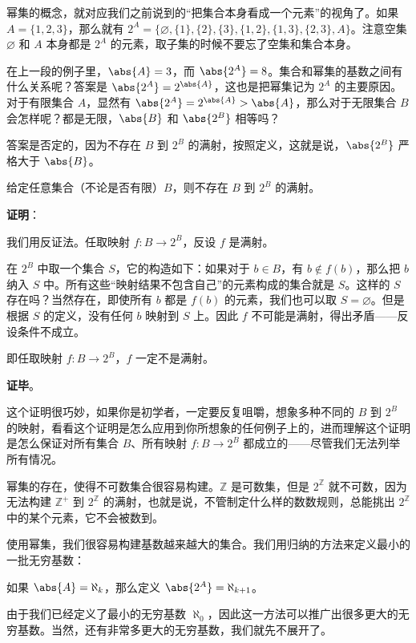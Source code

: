 幂集的概念，就对应我们之前说到的“把集合本身看成一个元素”的视角了。如果 $A=\{1,2,3\}$，那么就有 $2^A=\{\varnothing, \{1\}, \{2\}, \{3\}, \{1,2\}, \{1,3\}, \{2,3\}, A\}$。注意空集 $\varnothing$ 和 $A$ 本身都是 $2^A$ 的元素，取子集的时候不要忘了空集和集合本身。

在上一段的例子里，$\abs{A}=3$，而 $\abs{2^A}=8$。集合和幂集的基数之间有什么关系呢？答案是 $\abs{2^A}=2^{\abs{A}}$，这也是把幂集记为 $2^A$ 的主要原因。对于有限集合 $A$，显然有 $\abs{2^A}=2^{\abs{A}}>\abs{A}$，那么对于无限集合 $B$ 会怎样呢？都是无限，$\abs{B}$ 和 $\abs{2^B}$ 相等吗？

答案是否定的，因为不存在 $B$ 到 $2^B$ 的满射，按照定义，这就是说，$\abs{2^B}$ 严格大于 $\abs{B}$。

\begin{theorem}{}
给定任意集合（不论是否有限）$B$，则不存在 $B$ 到 $2^B$ 的满射。
\end{theorem}

\textbf{证明}：

我们用反证法。任取映射 $f:B\rightarrow 2^B$，反设 $f$ 是满射。

在 $2^B$ 中取一个集合 $S$，它的构造如下：如果对于 $b\in B$，有 $b\not\in f(b)$，那么把 $b$ 纳入 $S$ 中。所有这些“映射结果不包含自己”的元素构成的集合就是 $S$。这样的 $S$ 存在吗？当然存在，即使所有 $b$ 都是 $f(b)$ 的元素，我们也可以取 $S=\varnothing$。但是根据 $S$ 的定义，没有任何 $b$ 映射到 $S$ 上。因此 $f$ 不可能是满射，得出矛盾——反设条件不成立。

即任取映射 $f:B\rightarrow 2^B$，$f$ 一定不是满射。

\textbf{证毕}。

这个证明很巧妙，如果你是初学者，一定要反复咀嚼，想象多种不同的 $B$ 到 $2^B$ 的映射，看看这个证明是怎么应用到你所想象的任何例子上的，进而理解这个证明是怎么保证对所有集合 $B$、所有映射 $f:B\rightarrow 2^B$ 都成立的——尽管我们无法列举所有情况。

幂集的存在，使得不可数集合很容易构建。$\mathbb{Z}$ 是可数集，但是 $2^{\mathbb{Z}}$ 就不可数，因为无法构建 $\mathbb{Z}^+$ 到 $2^{\mathbb{Z}}$ 的满射，也就是说，不管制定什么样的数数规则，总能挑出 $2^{\mathbb{Z}}$ 中的某个元素，它不会被数到。

使用幂集，我们很容易构建基数越来越大的集合。我们用归纳的方法来定义最小的一批无穷基数：
\begin{definition}{}
如果 $\abs{A}=\aleph_k$，那么定义 $\abs{2^A}=\aleph_{k+1}$。
\end{definition}
由于我们已经定义了最小的无穷基数 $\aleph_0$，因此这一方法可以推广出很多更大的无穷基数。当然，还有非常多更大的无穷基数，我们就先不展开了。

